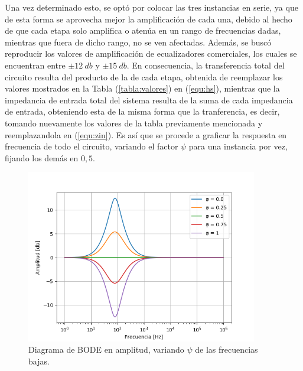 \documentclass[a4paper]{article}
\begin{document}
Una vez determinado esto, se optó por colocar las tres instancias en serie, ya que de esta forma se aprovecha mejor la amplificación de cada una, debido al hecho de que cada etapa solo amplifica o atenúa en un rango de frecuencias dadas, mientras que fuera de dicho rango, no se ven afectadas. Además, se buscó reproducir los valores de amplificación de ecualizadores comerciales, los cuales se encuentran entre $\pm 12 \ db$ y $\pm 15 \ db$.
En consecuencia, la transferencia total del circuito resulta del producto de la de cada etapa, obtenida de reemplazar los valores mostrados en la Tabla (\ref{tabla:valores}) en (\ref{equ:hs}), mientras que la impedancia de entrada total del sistema resulta de la suma de cada impedancia de entrada, obteniendo esta de la misma forma que la tranferencia, es decir, tomando nuevamente los valores de la tabla previamente mencionada y reemplazandola en (\ref{equ:zin}). Es así que se procede a graficar la respuesta en frecuencia de todo el circuito, variando el factor $\psi$ para una instancia por vez, fijando los demás en $0,5$.

\begin{figure}[H]
\centering
	\includegraphics[width=0.9\textwidth]{Imagenes/Low-psi-bode.png}
	\caption{Diagrama de BODE en amplitud, variando $\psi$ de las frecuencias bajas.}
	\label{fig:bode_modulo_low}
\end{figure}
\end{document}
